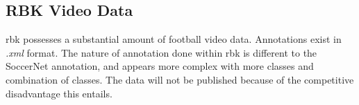 \subsection{RBK Video Data}

\acrfull{rbk} possesses a substantial amount of football video data. Annotations exist in \textit{.xml} format. The nature of annotation done within \acrshort{rbk} is different to the SoccerNet annotation, and appears more complex with more classes and combination of classes. The data will not be published because of the competitive disadvantage this entails.




